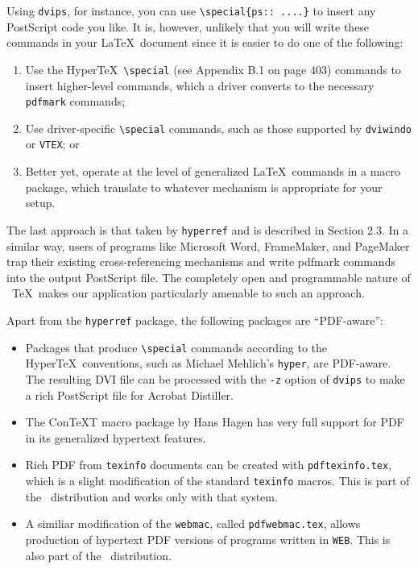 
Using \verb|dvips|, for instance, you can use \verb|\special{ps:: ....}|
to insert any PostScript code you like. It is, however, unlikely that
you will write these commands in your \LaTeX\ document since it is
easier to do one of the following: 

\begin{enumerate}
  \item Use the Hyper\TeX\  \verb|\special| (see Appendix B.1 on page 403) commands to insert higher-level commands, which a driver converts to the necessary \verb|pdfmark| commands; 
  \item Use driver-specific \verb|\special| commands, such as those supported by \verb|dviwindo| 
    or \verb|VTEX|; or 
  \item Better yet, operate at the level of generalized \LaTeX\  commands in a macro 
    package, which translate to whatever mechanism is appropriate for your setup. 
\end{enumerate}

The last approach is that taken by \verb|hyperref| and is described in
Section 2.3. In a similar way, users of programs like Microsoft Word,
FrameMaker, and PageMaker trap their existing cross-referencing
mechanisms and write pdfmark commands into the output PostScript file.
The completely open and programmable nature of \ \TeX\  makes our
application particularly amenable to such an approach. 

Apart from the \verb|hyperref| package, the following packages are
``PDF-aware'': 

\begin{itemize}
  \item Packages that produce \verb|\special| commands according to the
    Hyper\TeX\  conventions, such as Michael Mehlich's \verb|hyper|, are
    PDF-aware. The resulting DVI file can be processed with the \verb|-z| option
    of \verb|dvips| to make a rich PostScript file for Acrobat Distiller. 
  \item The Con\TeX T macro package by Hans Hagen has very full support for PDF 
    in its generalized hypertext features. 
  \item Rich PDF from \verb|texinfo| documents can be created with \verb|pdftexinfo.tex|, 
    which is a slight modification of the standard \verb|texinfo| macros. This is part 
    of the \pdfTEX\  distribution and works only with that system. 
  \item A similiar modification of the \verb|webmac|, called
    \verb|pdfwebmac.tex|, allows production of hypertext PDF versions of
    programs written in \verb|WEB|. This is also part of the \pdfTEX\
    distribution. 
\end{itemize}

